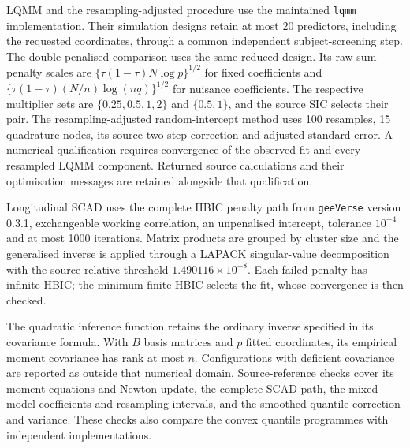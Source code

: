 LQMM and the resampling-adjusted procedure use the maintained
\texttt{lqmm} implementation. Their simulation designs retain at
most 20 predictors, including the requested coordinates, through
a common independent subject-screening step. The double-penalised
comparison uses the same reduced design. Its raw-sum penalty scales
are $\{\tau(1-\tau)N\log p\}^{1/2}$ for fixed coefficients and
$\{\tau(1-\tau)(N/n)\log(nq)\}^{1/2}$ for nuisance coefficients.
The respective multiplier sets are $\{0.25,0.5,1,2\}$ and
$\{0.5,1\}$, and the source SIC selects their pair. The
resampling-adjusted random-intercept method uses 100 resamples,
15 quadrature nodes, its source two-step correction and adjusted
standard error. A numerical qualification requires convergence of
the observed fit and every resampled LQMM component. Returned source
calculations and their optimisation messages are retained alongside
that qualification.

Longitudinal SCAD uses the complete HBIC penalty path from
\texttt{geeVerse} version 0.3.1, exchangeable working correlation,
an unpenalised intercept, tolerance $10^{-4}$ and at most 1000
iterations. Matrix products are grouped by cluster size and the
generalised inverse is applied through a LAPACK singular-value
decomposition with the source relative threshold
$1.490116\times10^{-8}$. Each failed penalty has infinite HBIC;
the minimum finite HBIC selects the fit, whose convergence is then
checked.

The quadratic inference function retains the ordinary inverse
specified in its covariance formula. With $B$ basis matrices and
$p$ fitted coordinates, its empirical moment covariance has rank
at most $n$. Configurations with deficient covariance are reported
as outside that numerical domain. Source-reference checks cover
its moment equations and Newton update, the complete SCAD path,
the mixed-model coefficients and resampling intervals, and the
smoothed quantile correction and variance. These checks also compare
the convex quantile programmes with independent implementations.
